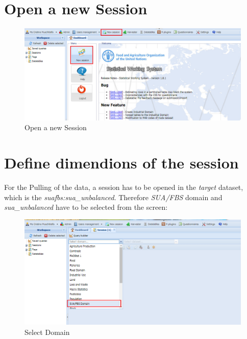 \documentclass[]{article}
\begin{document}
\section{Open a new Session}\label{open-a-new-session}

\begin{figure}[H]

{\centering \includegraphics[width=1\linewidth]{images/pullData/03_NewSession2} 

}

\caption{\label{fig:f3}Open a new Session}\label{fig:f3}
\end{figure}

\section{Define dimendions of the
session}\label{define-dimendions-of-the-session}

For the Pulling of the data, a session has to be opened in the
\emph{target} dataset, which is the \emph{suafbs:sua\_unbalanced}.
Therefore \emph{SUA/FBS} domain and \emph{sua\_unbalanced} have to be
selected from the screen:

\begin{figure}[H]

{\centering \includegraphics[width=1\linewidth]{images/pullData/04_domain} 

}

\caption{\label{fig:f4}Select Domain}\label{fig:f4}
\end{figure}
\end{document}
